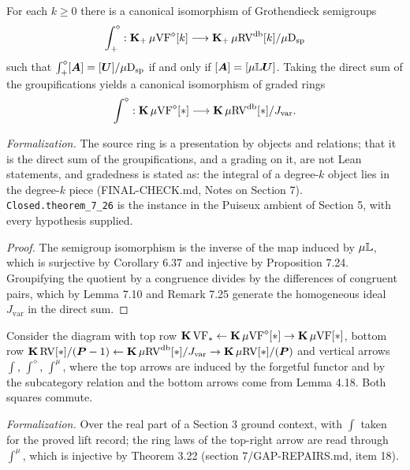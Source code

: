 \setcounter{theorem}{25}
\begin{theorem}
\label{main-prop}
\leanok
{}
For each $k \geq 0$ there is a canonical isomorphism of Grothendieck semigroups\[ \int^\diamond_+ : \operatorname{\mathbf{K}_+} \mu\mathrm{VF}^\diamond[k] \longrightarrow \operatorname{\mathbf{K}_+} \mu\mathrm{RV}^{\operatorname{db}}[k] / \mu\mathrm{D}_{\mathrm{sp}} \]such that $\int^\diamond_+ [\boldsymbol{A}] = [\boldsymbol{U}] / \mu\mathrm{D}_{\mathrm{sp}}$ if and only if $[\boldsymbol{A}] = [\mu\mathbb{L} \boldsymbol{U}]$. Taking the direct sum of the groupifications yields a canonical isomorphism of graded rings\[ \int^\diamond : \operatorname{\mathbf{K}} \mu\mathrm{VF}^\diamond[*] \longrightarrow \operatorname{\mathbf{K}} \mu\mathrm{RV}^{\operatorname{db}}[*] / J_{\mathrm{var}}. \]

\emph{Formalization.} The source ring is a presentation by objects and relations; that it is the direct sum of the groupifications, and a grading on it, are not Lean statements, and gradedness is stated as: the integral of a degree-$k$ object lies in the degree-$k$ piece (FINAL-CHECK.md, Notes on Section 7). \texttt{Closed.theorem\_7\_26} is the instance in the Puiseux ambient of Section 5, with every hypothesis supplied.
\end{theorem}

\begin{proof}
\leanok
The semigroup isomorphism is the inverse of the map induced by $\mu\mathbb{L}$, which is surjective by Corollary 6.37 and injective by Proposition 7.24. Groupifying the quotient by a congruence divides by the differences of congruent pairs, which by Lemma 7.10 and Remark 7.25 generate the homogeneous ideal $J_{\mathrm{var}}$ in the direct sum.
\end{proof}

\setcounter{theorem}{26}
\begin{corollary}
\label{db-to-novol}
\leanok
{}
Consider the diagram with top row $\operatorname{\mathbf{K}} \mathrm{VF}_* \leftarrow \operatorname{\mathbf{K}} \mu\mathrm{VF}^\diamond[*] \rightarrow \operatorname{\mathbf{K}} \mu\mathrm{VF}[*]$, bottom row $\operatorname{\mathbf{K}} \mathrm{RV}[*] / (\boldsymbol{P} - 1) \leftarrow \operatorname{\mathbf{K}} \mu\mathrm{RV}^{\operatorname{db}}[*] / J_{\mathrm{var}} \rightarrow \operatorname{\mathbf{K}} \mu\mathrm{RV}[*] / (\boldsymbol{P})$ and vertical arrows $\int$, $\int^\diamond$, $\int^\mu$, where the top arrows are induced by the forgetful functor and by the subcategory relation and the bottom arrows come from Lemma 4.18. Both squares commute.

\emph{Formalization.} Over the real part of a Section 3 ground context, with $\int$ taken for the proved lift record; the ring laws of the top-right arrow are read through $\int^\mu$, which is injective by Theorem 3.22 (section 7/GAP-REPAIRS.md, item 18).
\end{corollary}

